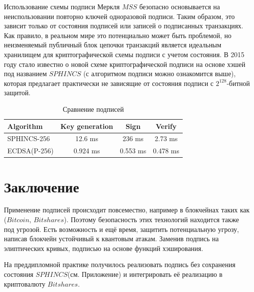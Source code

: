 \documentclass[a4paper, 14pt]{extarticle}
\begin{document}
Использование схемы подписи Меркля $MSS$ безопасно основывается на неиспользовании повторно ключей одноразовой подписи. Таким образом, это зависит только от состояния подписей или записей о подписанных транзакциях. Как правило, в реальном мире это потенциально может быть проблемой, но неизменяемый публичный блок цепочки транзакций является идеальным хранилищем для криптографической схемы подписи с учетом состояния. В 2015 году стало известно о новой схеме криптографической подписи на основе хэшей под названием $SPHINCS$ (с алгоритмом подписи можно ознакомится выше), которая предлагает практически не зависящие от состояния подписи с $2^{128}$-битной защитой.
\begin{table}[h!]
    \begin{center}
      \caption{Сравнение подписей}
      \label{tab:table1}
      \begin{tabular}{l|c|c|c}
        \textbf{Algorithm} & \textbf{Key generation} & \textbf{Sign} & \textbf{Verify}\\
        \hline
        SPHINCS-256 & 12.6 ms & 236 ms & 2.73 ms\\
        ECDSA(P-256) & 0.924 ms & 0.553 ms & 0.478 ms\\
      \end{tabular}
    \end{center}
  \end{table}
\newpage

\section{Заключение}
Применение подписей происходит повсеместно, например в блокчейнах таких как ($Bitcoin$, $Bitshares$). Поэтому безопасность этих технологий находится также под угрозой. Есть возможность и ещё время, защитить потенциальную угрозу, написав блокчейн устойчивый к квантовым атакам. Заменив подпись на элиптических кривых, подписью на основе функций хэширования.

На преддипломной практике получилось реализовать подпись без сохранения состояния $SPHINCS$(см. Приложение) и интегрировать её реализацию в криптовалюту $Bitshares$. 
\newpage

\end{document}
